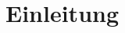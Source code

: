 \documentclass{HSMW-Thesis}
\begin{document}
\begin{Referat}
\end{Referat}

\begin{Vorwort}
\end{Vorwort}

\Hauptteil

\chapter{Einleitung}


\Anhang


\begin{thebibliography}{99}
\bibitem{} 
\end{thebibliography}
\end{document}
